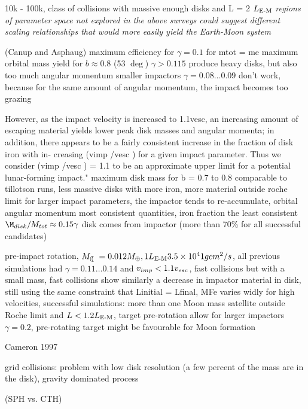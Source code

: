 \citep{Canup:2001p3295}
10k - 100k, class of collisions with massive enough disks and L = 2 $L_{\textrm{E-M}}$
\emph{regions of parameter space not explored in the above surveys could suggest different scaling relationships that would more easily yield the Earth-Moon system}

\cite{Canup:2001p1861} (Canup and Asphaug)
maximum efficiency for $\gamma = 0.1$ for mtot = me
maximum orbital mass yield for $b \approx 0.8 $ (53 $\deg$)
$\gamma > 0.115$ produce heavy disks, but also too much angular momentum
smaller impactors $\gamma = 0.08 \dots 0.09$ don't work, because for the same amount of angular momentum, the impact becomes too grazing


\citep{Canup:2004p115}  However, as the impact velocity is increased to 1.1vesc, an increasing amount of escaping material yields lower peak disk masses and angular momenta; in addition, there appears to be a fairly consistent increase in the fraction of disk iron with in- creasing	(vimp /vesc ) for a given impact parameter. Thus we consider (vimp /vesc ) = 1.1 to be an approximate upper limit for a potential lunar-forming impact."
maximum disk mass for b = 0.7 to 0.8
comparable to tillotson runs, less massive disks with more iron, more material outside roche limit
for larger impact parameters, the impactor tends to re-accumulate, 
orbital angular momentum most consistent quantities, iron fraction the least consistent
$\M_{disk} / \Mtot \approx 0.15 \gamma$ 
disk comes from impactor (more than 70\% for all successful candidates)

\citep{Canup:2005p1987}

\citep{Canup:2008p3551}
pre-impact rotation, $\ML = 0.012 \ME, 1 \lem 3.5 \times 10^41 g cm^2 / s$, all previous simulations had $\gamma = 0.11 \dots 0.14$ and $v_{imp} < 1.1 v_{esc}$, fast collisions but with a small mass, fast collisions show similarly a decrease in impactor material in disk, still using the same constraint that Linitial = Lfinal, MFe varies widly for high velocities, successful simulations: more than one Moon mass satellite outside Roche limit and $L < 1.2 L_{\textrm{E-M}}$, target pre-rotation allow for larger impactors $\gamma = 0.2$, pre-rotating target might be favourable for Moon formation

\cite{1997Icar..126..126C} Cameron 1997

grid collisions:
\cite{Wada:2006p1013}
problem with low disk resolution (a few percent of the mass are in the disk), gravity dominated process


\citep{Canup:2010p3713} (SPH vs. CTH)

